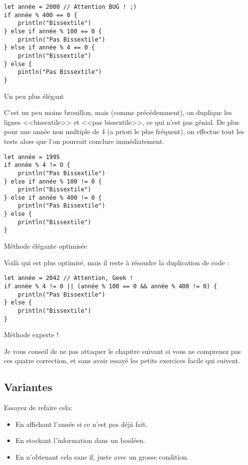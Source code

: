 \begin{listing}[h!]
\begin{verbatim}
let année = 2000 // Attention BUG ! ;)
if année % 400 == 0 {
    println("Bissextile")
} else if année % 100 == 0 {
    println("Pas Bissextile")
} else if année % 4 == 0 {
    println("Bissextile")
} else {
    pintln("Pas Bissextile")
}
\end{verbatim}
\caption{Un peu plus élégant}
\end{listing}
C'est un peu moins brouillon, mais (comme précédemment), on duplique les lignes <<bissextile>> et <<pas bissextile>>, ce qui n'est pas génial. De plus pour une année non multiple de 4 (a priori le plus fréquent), on effectue tout les tests alors que l'on pourrait conclure immédiatement.

\begin{listing}[h!]
\begin{verbatim}
let année = 1995
if année % 4 != O {
    println("Pas Bissextile")
} else if année % 100 != 0 {
    println("Bissextile")
} else if année % 400 != 0 {
    println("Pas Bissextile")
} else {
    println("Bissextile")
}
\end{verbatim}
\caption{Méthode élégante optimisée}
\end{listing}
Voilà qui est plus optimisé, mais il reste à résoudre la duplication de code :

\begin{listing}[h!]
\begin{verbatim}
let année = 2042 // Attention, Geek !
if année % 4 != 0 || (année % 100 == 0 && année % 400 != 0) {
    println("Pas Bissextile")
} else {
    println("Bissextile")
}
\end{verbatim}
\caption{Méthode experte !}
\end{listing}

Je vous conseil de ne pas attaquer le chapitre suivant
si vous ne comprenez pas ces quatre correction,
et sans avoir essayé les petits exercices facile qui suivent.
\subsection{Variantes}
Essayez de refaire cela:
\begin{itemize}

\item En affichant l'année si ce n'est pas déjà fait.
\item En stockant l'information dans un booléen.
\item En n'obtenant cela sans if, juste avec un grosse condition.

\end{itemize}
